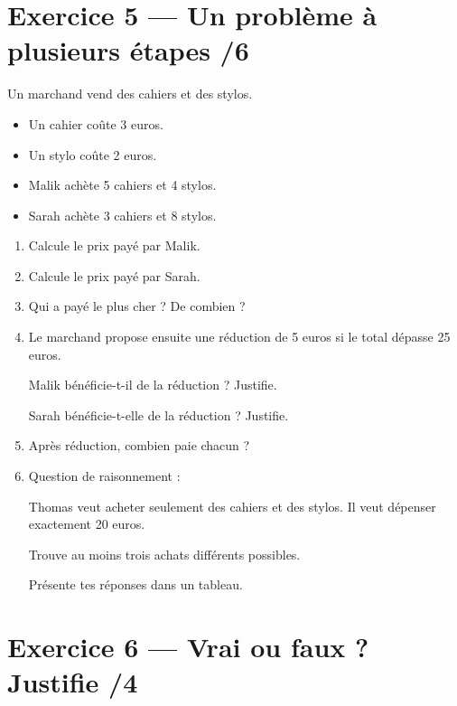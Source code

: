 \documentclass[11pt,a4paper]{article}
\begin{document}
\vspace{4mm}

\section*{Exercice 5 — Un problème à plusieurs étapes \hfill /6}

Un marchand vend des cahiers et des stylos.

\begin{itemize}
    \item Un cahier coûte 3 euros.
    \item Un stylo coûte 2 euros.
    \item Malik achète 5 cahiers et 4 stylos.
    \item Sarah achète 3 cahiers et 8 stylos.
\end{itemize}

\begin{enumerate}[label=\textbf{\arabic*)}]
    \item Calcule le prix payé par Malik.
    \item Calcule le prix payé par Sarah.
    \item Qui a payé le plus cher ? De combien ?
    \item Le marchand propose ensuite une réduction de 5 euros si le total dépasse 25 euros.
    
    Malik bénéficie-t-il de la réduction ? Justifie.
    
    Sarah bénéficie-t-elle de la réduction ? Justifie.

    \item Après réduction, combien paie chacun ?
    
    \item Question de raisonnement :
    
    Thomas veut acheter seulement des cahiers et des stylos. Il veut dépenser exactement 20 euros.
    
    Trouve au moins trois achats différents possibles.
    
    Présente tes réponses dans un tableau.
\end{enumerate}

\vspace{4mm}

\section*{Exercice 6 — Vrai ou faux ? Justifie \hfill /4}
\end{document}
